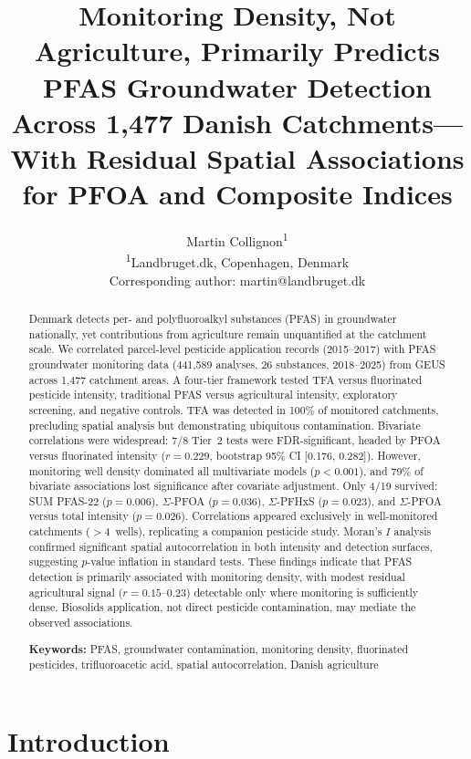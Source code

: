 \documentclass[12pt,a4paper]{article}
\title{\textbf{Monitoring Density, Not Agriculture, Primarily Predicts PFAS Groundwater Detection Across 1,477 Danish Catchments---With Residual Spatial Associations for PFOA and Composite Indices}}
\author{Martin Collignon\textsuperscript{1}\\[6pt]
\textsuperscript{1}Landbruget.dk, Copenhagen, Denmark\\[3pt]
\small Corresponding author: martin@landbruget.dk}
\date{}
\begin{document}
\maketitle
\thispagestyle{fancy}

\begin{abstract}
Denmark detects per- and polyfluoroalkyl substances (PFAS) in groundwater nationally, yet contributions from agriculture remain unquantified at the catchment scale. We correlated parcel-level pesticide application records (2015--2017) with PFAS groundwater monitoring data (441,589 analyses, 26 substances, 2018--2025) from GEUS across 1,477 catchment areas. A four-tier framework tested TFA versus fluorinated pesticide intensity, traditional PFAS versus agricultural intensity, exploratory screening, and negative controls. TFA was detected in 100\% of monitored catchments, precluding spatial analysis but demonstrating ubiquitous contamination. Bivariate correlations were widespread: 7/8 Tier~2 tests were FDR-significant, headed by PFOA versus fluorinated intensity ($r = 0.229$, bootstrap 95\% CI [0.176, 0.282]). However, monitoring well density dominated all multivariate models ($p < 0.001$), and 79\% of bivariate associations lost significance after covariate adjustment. Only 4/19 survived: SUM PFAS-22 ($p = 0.006$), $\Sigma$-PFOA ($p = 0.036$), $\Sigma$-PFHxS ($p = 0.023$), and $\Sigma$-PFOA versus total intensity ($p = 0.026$). Correlations appeared exclusively in well-monitored catchments ($>$4~wells), replicating a companion pesticide study. Moran's $I$ analysis confirmed significant spatial autocorrelation in both intensity and detection surfaces, suggesting $p$-value inflation in standard tests. These findings indicate that PFAS detection is primarily associated with monitoring density, with modest residual agricultural signal ($r = 0.15$--$0.23$) detectable only where monitoring is sufficiently dense. Biosolids application, not direct pesticide contamination, may mediate the observed associations.

\medskip
\noindent\textbf{Keywords:} PFAS, groundwater contamination, monitoring density, fluorinated pesticides, trifluoroacetic acid, spatial autocorrelation, Danish agriculture
\end{abstract}

\clearpage
\tableofcontents
\clearpage

\section{Introduction}
\end{document}
